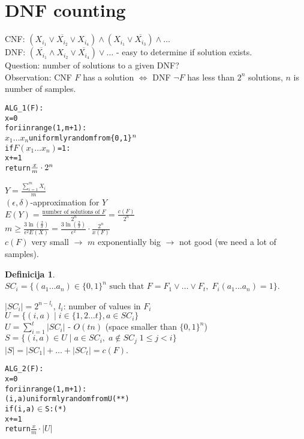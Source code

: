 \documentclass[a4paper, 12pt]{book}
\theoremstyle{definition}
\newtheorem{defn}[counter]{Definicija}
\theoremstyle{remark}
\begin{document}
\section{DNF counting}

CNF: $(X_{i_1} \lor \overline{X_{i_2}} \lor X_{i_4}) \land (X_{i_1} \lor \overline{X_{i_3}}) \land \dots$ \\
DNF: $(\overline{X_{i_1}} \land X_{i_2} \lor \overline{X_{i_4}}) \lor \dots$
- easy to determine if solution exists. \\
Question: number of solutions to a given DNF? \\
Observation: CNF $F$ has a solution $\iff$ DNF $\neg F$ has less than $2^n$ solutions, $n$ is number of samples.
\begin{alltt}
  ALG_1(F):
    x = 0
    for i in range(1,m+1):
      \(x_1 \dots x_n\) uniformly random from \{0,1\}\(\sp{n}\)
      if \(F(x_1 \dots x_n)\) = 1:
        x += 1
    return \(\frac{x}{m} \cdot 2\sp{n}\)
\end{alltt}
$Y = \frac{\sum_{i=1}^{m} X_i}{m}$ \\
$(\epsilon,\delta)$-approximation for $Y$ \\
$E(Y) = \frac{\text{number of solutions of }F}{2^n} = \frac{c(F)}{2^n}$ \\
$m \geq \frac{3 \ln\left(\frac{2}{\delta}\right)}{\epsilon^2 E(X)} =
\frac{3 \ln\left(\frac{2}{\delta}\right)}{\epsilon^2} \cdot \frac{2^n}{x(F)}$ \\
$c(F)$ very small $\to$ $m$ exponentially big $\to$ not good (we need a lot of samples).
\begin{defn} \text{} \\
  $SC_i = \{(a_1 \dots a_n) \in \{0,1\}^n \text{ such that } F = F_1 \lor \dots \lor F_t, \; F_i(a_1 \dots a_n) = 1\}$.
\end{defn}
$|SC_i| = 2^{n-l_i}$, $l_i$: number of values in $F_i$ \\
$U = \{(i,a) \mid i \in \{1,2 \dots t\}, a \in SC_i\}$ \\
$U = \sum_{i=1}^{t} |SC_i|$ - $O(tn)$ (space smaller than $\{0,1\}^n$) \\
$S = \{(i,a) \in U \mid a \in SC_i, \; a \not \in SC_j \; 1 \leq j < i\}$ \\
$|S| = |SC_1| + \dots + |SC_t| = c(F)$.
\begin{alltt}
  ALG_2(F):
    x = 0
    for i in range(1,m+1):
      (i, a) uniformly random from U (**)
      if (i, a) \(\in\) S: (*)
        x += 1
    return \(\frac{x}{m} \cdot |U|\)
\end{alltt}
\end{document}
